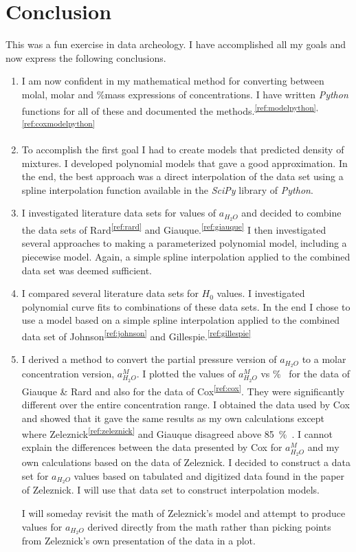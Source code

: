 \documentclass[]{tufte-handout}
\newcommand{\tss}[1]{\textsuperscript{#1}}
\begin{document}
\section{Conclusion}

This was a fun exercise in data archeology. I have accomplished all my goals and now express the following conclusions.

\begin{enumerate}

\item I am now confident in my mathematical method for converting between molal, molar and \%mass expressions of concentrations. I have written \textit{Python} functions for all of these and documented the methods.\tss{\ref{ref:modelpython},\ref{ref:coxmodelpython}} 

\item To accomplish the first goal I had to create models that predicted density of  mixtures. I developed polynomial models that gave a good approximation. In the end, the best approach was a direct interpolation of the data set using a spline interpolation function available in the \textit{SciPy} library of \textit{Python}.

\item I investigated literature data sets for values of $a_{H_2O}$ and decided to combine the data sets of Rard\tss{\ref{ref:rard}} and Giauque.\tss{\ref{ref:giauque}} I then investigated several approaches to making a parameterized polynomial model, including a piecewise model. Again, a simple spline interpolation applied to the combined data set was deemed sufficient.

\item I compared several literature data sets for $H_0$ values. I investigated polynomial curve fits to combinations of these data sets. In the end I chose to use a model based on a simple spline interpolation applied to the combined data set of Johnson\tss{\ref{ref:johnson}} and Gillespie.\tss{\ref{ref:gillespie}}

\item I derived a method to convert the partial pressure version of $a_{H_2O}$ to a molar concentration version, $a_{H_2O}^M$. I plotted the values of $a_{H_2O}^M$ vs \unit{\percent{}} for the data of Giauque \& Rard  and also for the data of Cox\tss{\ref{ref:cox}}. They were significantly different over the entire concentration range. I obtained the data used by Cox and showed that it gave the same results as my own calculations except where Zeleznick\tss{\ref{ref:zeleznick}} and Giauque disagreed above \qty{85}{\percent{}}. I cannot explain the differences between the data presented by Cox for $a_{H_2O}^M$ and my own calculations based on the data of Zeleznick. I decided to construct a data set for $a_{H_2O}$ values based on tabulated and digitized data found in the paper of Zeleznick. I will use that data set to construct interpolation models.

I will someday revisit the math of Zeleznick's model and attempt to produce values for $a_{H_2O}$ derived directly from the math rather than picking points from Zeleznick's own presentation of the data in a plot.

\end{enumerate}
\end{document}
